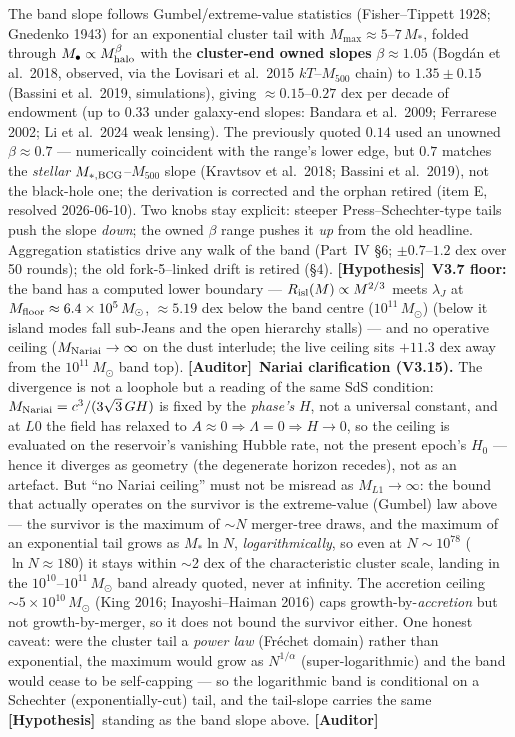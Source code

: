 \documentclass[11pt]{article}
\newcommand{\Auditor}{\textbf{\textcolor{teal!55!black}{[Auditor]}}}
\newcommand{\hyp}{\textcolor{orange!80!black}{\textbf{[Hypothesis]}}}
\newcommand{\msun}{M_\odot}
\begin{document}
The band slope follows Gumbel/extreme-value statistics (Fisher--Tippett 1928; Gnedenko 1943) for an exponential cluster tail with $M_{\max}\approx5$--$7\,M_*$, folded through $M_\bullet\propto M_{\rm halo}^{\beta}$ with the \textbf{cluster-end owned slopes} $\beta\approx1.05$ (Bogd\'an et al.\ 2018, observed, via the Lovisari et al.\ 2015 $kT$--$M_{500}$ chain) to $1.35\pm0.15$ (Bassini et al.\ 2019, simulations), giving $\approx0.15$--$0.27$ dex per decade of endowment (up to $0.33$ under galaxy-end slopes: Bandara et al.\ 2009; Ferrarese 2002; Li et al.\ 2024 weak lensing). The previously quoted $0.14$ used an unowned $\beta\approx0.7$ --- numerically coincident with the range's lower edge, but $0.7$ matches the \emph{stellar} $M_{*,\rm BCG}$--$M_{500}$ slope (Kravtsov et al.\ 2018; Bassini et al.\ 2019), not the black-hole one; the derivation is corrected and the orphan retired (item E, resolved 2026-06-10). Two knobs stay explicit: steeper Press--Schechter-type tails push the slope \emph{down}; the owned $\beta$ range pushes it \emph{up} from the old headline. Aggregation statistics drive any walk of the band (Part~IV \S6; $\pm0.7$--$1.2$ dex over 50 rounds); the old fork-5--linked drift is retired (\S4). \hyp\ \textbf{V3.7 floor:} the band has a computed lower boundary --- $R_{\rm isl}(M)\propto M^{2/3}$ meets $\lambda_J$ at $M_{\rm floor}\approx6.4\times10^{5}\,\msun$, $\approx5.19$ dex below the band centre ($10^{11}\,\msun$) (below it island modes fall sub-Jeans and the open hierarchy stalls) --- and no operative ceiling ($M_{\rm Nariai}\to\infty$ on the dust interlude; the live ceiling sits $+11.3$ dex away from the $10^{11}\,M_\odot$ band top). \Auditor\ \textbf{Nariai clarification (V3.15).} The divergence is not a loophole but a reading of the same SdS condition: $M_{\rm Nariai}=c^3/(3\sqrt3\,GH)$ is fixed by the \emph{phase's} $H$, not a universal constant, and at $L0$ the field has relaxed to $A\approx0\Rightarrow\Lambda=0\Rightarrow H\to0$, so the ceiling is evaluated on the reservoir's vanishing Hubble rate, not the present epoch's $H_0$ --- hence it diverges as geometry (the degenerate horizon recedes), not as an artefact. But ``no Nariai ceiling'' must not be misread as $M_{L1}\to\infty$: the bound that actually operates on the survivor is the extreme-value (Gumbel) law above --- the survivor is the maximum of $\sim\!N$ merger-tree draws, and the maximum of an exponential tail grows as $M_*\ln N$, \emph{logarithmically}, so even at $N\sim10^{78}$ ($\ln N\approx180$) it stays within $\sim$2 dex of the characteristic cluster scale, landing in the $10^{10}$--$10^{11}\,\msun$ band already quoted, never at infinity. The accretion ceiling $\sim5\times10^{10}\,\msun$ (King 2016; Inayoshi--Haiman 2016) caps growth-by-\emph{accretion} but not growth-by-merger, so it does not bound the survivor either. One honest caveat: were the cluster tail a \emph{power law} (Fr\'echet domain) rather than exponential, the maximum would grow as $N^{1/\alpha}$ (super-logarithmic) and the band would cease to be self-capping --- so the logarithmic band is conditional on a Schechter (exponentially-cut) tail, and the tail-slope carries the same \hyp\ standing as the band slope above. \Auditor
\end{document}
